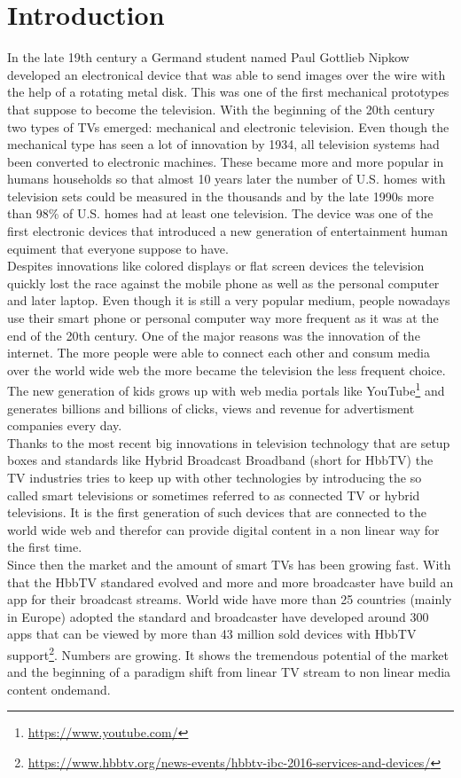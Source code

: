 \chapter{Introduction\label{cha:introduction}}

In the late 19th century a Germand student named Paul Gottlieb Nipkow developed an electronical device
that was able to send images over the wire with the help of a rotating metal disk. This was one of the first
mechanical prototypes that suppose to become the television. With the beginning of the 20th century two types
of TVs emerged: mechanical and electronic television. Even though the mechanical type has seen a lot of
innovation by 1934, all television systems had been converted to electronic machines. These became more and
more popular in humans households so that almost 10 years later the number of U.S. homes with television sets
could be measured in the thousands and by the late 1990s more than 98\% of U.S. homes had at least one
television. The device was one of the first electronic devices that introduced a new generation of entertainment
human equiment that everyone suppose to have.\\
Despites innovations like colored displays or flat screen devices the television quickly lost the race against
the mobile phone as well as the personal computer and later laptop. Even though it is still a very popular
medium, people nowadays use their smart phone or personal computer way more frequent as it was at the end of the
20th century. One of the major reasons was the innovation of the internet. The more people were able to connect
each other and consum media over the world wide web the more became the television the less frequent choice.
The new generation of kids grows up with web media portals like YouTube\footnote{\url{https://www.youtube.com/}}
and generates billions and billions of clicks, views and revenue for advertisment companies every day.\\
Thanks to the most recent big innovations in television technology that are setup boxes and standards like
Hybrid Broadcast Broadband (short for HbbTV) the TV industries tries to keep up with other technologies by
introducing the so called smart televisions or sometimes referred to as connected TV or hybrid televisions.
It is the first generation of such devices that are connected to the world wide web and therefor can provide
digital content in a non linear way for the first time.\\
Since then the market and the amount of smart TVs has been growing fast. With that the HbbTV standared evolved
and more and more broadcaster have build an app for their broadcast streams. World wide have more than 25
countries (mainly in Europe) adopted the standard and broadcaster have developed around 300 apps that can
be viewed by more than 43 million sold devices with HbbTV support\footnote{\url{https://www.hbbtv.org/news-events/hbbtv-ibc-2016-services-and-devices/}}.
Numbers are growing. It shows the tremendous potential of the market and the beginning of a paradigm shift
from linear TV stream to non linear media content ondemand.

